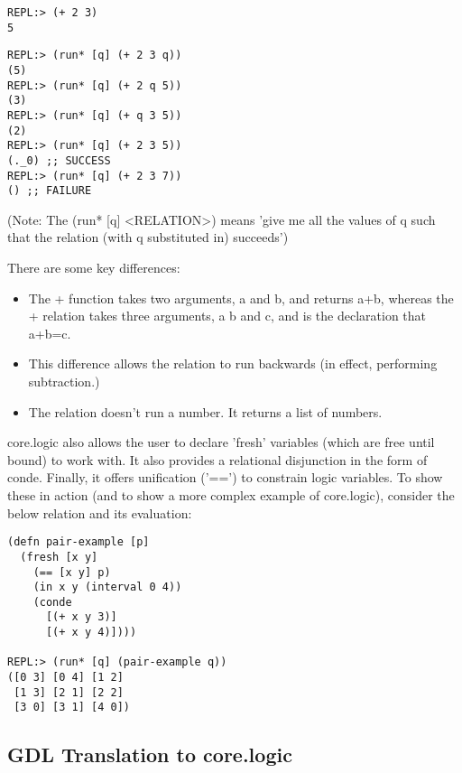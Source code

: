 \documentclass[letterpaper]{article}
\begin{document}
\begin{lstlisting}[frame=single, caption=The + function]
REPL:> (+ 2 3)
5
\end{lstlisting}

\begin{lstlisting}[frame=single, caption=The + relation]
REPL:> (run* [q] (+ 2 3 q))
(5)
REPL:> (run* [q] (+ 2 q 5))
(3)
REPL:> (run* [q] (+ q 3 5))
(2)
REPL:> (run* [q] (+ 2 3 5))
(._0) ;; SUCCESS
REPL:> (run* [q] (+ 2 3 7))
() ;; FAILURE
\end{lstlisting}

(Note: The (run* [q] \textless RELATION\textgreater) means 'give me all the values of q such that the relation (with q substituted in) succeeds')

There are some key differences:
\begin{itemize}
\item The + function takes two arguments, a and b, and returns a+b, whereas the + relation takes three arguments, a b and c, and is the declaration that a+b=c.
\item This difference allows the relation to run backwards (in effect, performing subtraction.)
\item The relation doesn't run a number. It returns a list of numbers.
\end{itemize}

core.logic also allows the user to declare 'fresh' variables (which are free until bound) to work with. It also provides a relational disjunction in the form of conde. Finally, it offers unification ('==') to constrain logic variables. To show these in action (and to show a more complex example of core.logic), consider the below relation and its evaluation:

\begin{lstlisting}[frame=single, caption=Relation to generate all pairs of whole numbers (x y) such that x+y equals 3 or 4]
(defn pair-example [p]
  (fresh [x y]
    (== [x y] p)
    (in x y (interval 0 4))
    (conde
      [(+ x y 3)]
      [(+ x y 4)])))

REPL:> (run* [q] (pair-example q))
([0 3] [0 4] [1 2]
 [1 3] [2 1] [2 2]
 [3 0] [3 1] [4 0])
\end{lstlisting}

\subsection{GDL Translation to core.logic}
\end{document}
